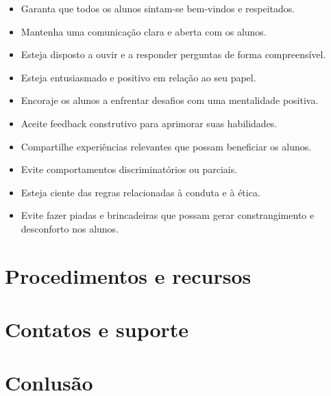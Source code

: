 \begin{itemize}[label = \textcolor{main}{\textbullet}]
    \item Garanta que todos os alunos sintam-se bem-vindos e respeitados.

    \item Mantenha uma comunicação clara e aberta com os alunos.
    
    \item Esteja disposto a ouvir e a responder perguntas de forma compreensível.

    \item Esteja entusiasmado e positivo em relação ao seu papel.
    
    \item Encoraje os alunos a enfrentar desafios com uma mentalidade positiva.

    \item Aceite feedback construtivo para aprimorar suas habilidades.

    \item Compartilhe experiências relevantes que possam beneficiar os alunos.

    \item Evite comportamentos discriminatórios ou parciais.

    \item Esteja ciente das regras relacionadas à conduta e à ética.

    \item Evite fazer piadas e brincadeiras que possam gerar constrangimento e desconforto nos alunos.
\end{itemize}

\section{Procedimentos e recursos}

\section{Contatos e suporte}

\section{Conlusão}



